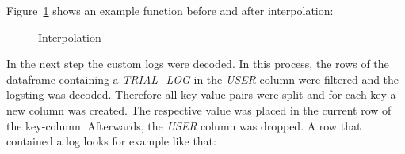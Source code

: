 \documentclass[
  12pt,
  letterpaper,
  DIV=11,
  numbers=noendperiod]{scrreprt}
\newenvironment{Shaded}{\begin{snugshade}}{\end{snugshade}}
\newcommand{\BuiltInTok}[1]{\textcolor[rgb]{0.00,0.23,0.31}{#1}}
\newcommand{\CommentTok}[1]{\textcolor[rgb]{0.37,0.37,0.37}{#1}}
\newcommand{\ControlFlowTok}[1]{\textcolor[rgb]{0.00,0.23,0.31}{\textbf{#1}}}
\newcommand{\KeywordTok}[1]{\textcolor[rgb]{0.00,0.23,0.31}{\textbf{#1}}}
\newcommand{\NormalTok}[1]{\textcolor[rgb]{0.00,0.23,0.31}{#1}}
\newcommand{\OperatorTok}[1]{\textcolor[rgb]{0.37,0.37,0.37}{#1}}
\newcommand{\StringTok}[1]{\textcolor[rgb]{0.13,0.47,0.30}{#1}}
\begin{document}
%

Figure~\ref{fig-interpolation} shows an example function before and
after interpolation:

\begin{figure}


\caption{\label{fig-interpolation}Interpolation}

\end{figure}%

In the next step the custom logs were decoded. In this process, the rows
of the dataframe containing a \emph{TRIAL\_LOG} in the \emph{USER}
column were filtered and the logsting was decoded. Therefore all
key-value pairs were split and for each key a new column was created.
The respective value was placed in the current row of the key-column.
Afterwards, the \emph{USER} column was dropped. A row that contained a
log looks for example like that:
\end{document}
